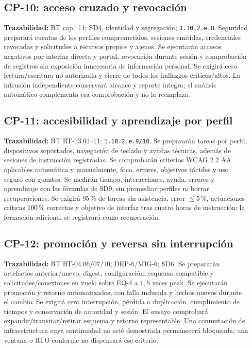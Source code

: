 \subsection{CP-10: acceso cruzado y revocación}
\label{caso:cp-10}
\textbf{Trazabilidad:} BT cap.~11; SD4, identidad y segregación; \texttt{1.10.2.e.8}. Seguridad preparará cuentas de los perfiles comprometidos, sesiones emitidas, credenciales revocadas y solicitudes a recursos propios y ajenos. Se ejecutarán accesos negativos por interfaz directa y portal, revocación durante sesión y comprobación de registros sin exposición innecesaria de información personal. Se exigirá cero lectura/escritura no autorizada y cierre de todos los hallazgos críticos/altos. La intrusión independiente conservará alcance y reporte íntegro; el análisis automático complementa esa comprobación y no la reemplaza.

\subsection{CP-11: accesibilidad y aprendizaje por perfil}
\label{caso:cp-11}
\textbf{Trazabilidad:} BT RT-13.01--11; \texttt{1.10.2.e.9/10}. Se prepararán tareas por perfil, dispositivos soportados, navegación de teclado y ayudas técnicas, además de sesiones de instrucción registradas. Se comprobarán criterios WCAG 2.2 AA aplicables automática y manualmente, foco, errores, objetivos táctiles y uso seguro con guantes. Se medirán tiempo, interacciones, ayuda, errores y aprendizaje con las fórmulas de SD9, sin promediar perfiles ni borrar recuperaciones. Se exigirá 95\,\% de tareas sin asistencia, error $\leq5\,\%$, actuaciones críticas 100\,\% correctas y objetivo de interfaz tras cuatro horas de instrucción; la formación adicional se registrará como recuperación.

\subsection{CP-12: promoción y reversa sin interrupción}
\label{caso:cp-12}
\textbf{Trazabilidad:} BT RT-04.06/07/10; DEP-6/MIG-6; SD6. Se prepararán artefactos anterior/nuevo, digest, configuración, esquema compatible y solicitudes/conexiones en vuelo sobre EQ-4 a $1,5$ veces peak. Se ejecutarán promoción y retorno automatizados, con falla inducida y hechos nuevos durante el cambio. Se exigirá cero interrupción, pérdida o duplicación, cumplimiento de tiempos y conservación de autoridad y sesión. El ensayo comprobará expandir/transitar/retirar esquema y retorno representable. Una conmutación de infraestructura cuya continuidad no esté demostrada permanecerá bloqueada; una ventana o RTO conforme no dispensará ese criterio.

